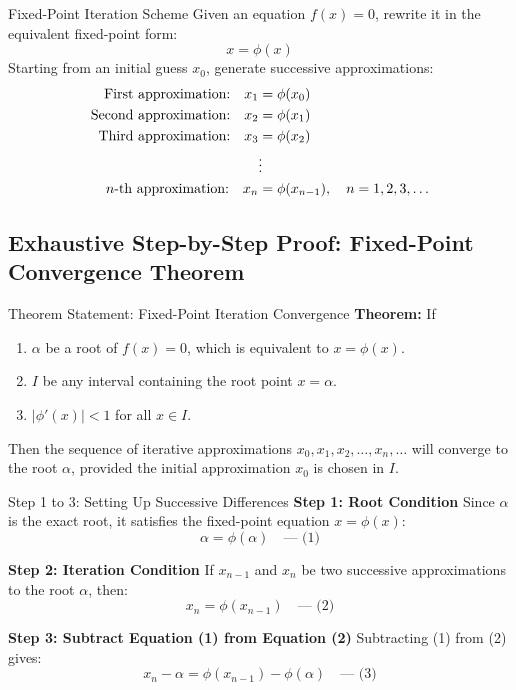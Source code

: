 \documentclass[11pt,a4paper]{article}
\begin{document}
\begin{defbox}{Fixed-Point Iteration Scheme}
Given an equation $f(x) = 0$, rewrite it in the equivalent fixed-point form:
\begin{equation}
    x = \phi(x)
\end{equation}
Starting from an initial guess $x_0$, generate successive approximations:
\begin{align}
    \text{First approximation:} \quad x_1 &= \phi(x_0) \notag \\
    \text{Second approximation:} \quad x_2 &= \phi(x_1) \notag \\
    \text{Third approximation:} \quad x_3 &= \phi(x_2) \notag \\
    &\vdots \notag \\
    \text{$n$-th approximation:} \quad x_n &= \phi(x_{n-1}), \quad n = 1, 2, 3, \dots
\end{align}
\end{defbox}

\subsection{Exhaustive Step-by-Step Proof: Fixed-Point Convergence Theorem}

\begin{defbox}{Theorem Statement: Fixed-Point Iteration Convergence}
\textbf{Theorem:} If
\begin{enumerate}
    \item[(i)] $\alpha$ be a root of $f(x) = 0$, which is equivalent to $x = \phi(x)$.
    \item[(ii)] $I$ be any interval containing the root point $x = \alpha$.
    \item[(iii)] $|\phi'(x)| < 1$ for all $x \in I$.
\end{enumerate}
Then the sequence of iterative approximations $x_0, x_1, x_2, \dots, x_n, \dots$ will converge to the root $\alpha$, provided the initial approximation $x_0$ is chosen in $I$.
\end{defbox}

\begin{exbox}{Step 1 to 3: Setting Up Successive Differences}
\textbf{Step 1: Root Condition}
Since $\alpha$ is the exact root, it satisfies the fixed-point equation $x = \phi(x)$:
\begin{equation}
    \alpha = \phi(\alpha) \quad \text{--- (1)}
\end{equation}

\textbf{Step 2: Iteration Condition}
If $x_{n-1}$ and $x_n$ be two successive approximations to the root $\alpha$, then:
\begin{equation}
    x_n = \phi(x_{n-1}) \quad \text{--- (2)}
\end{equation}

\textbf{Step 3: Subtract Equation (1) from Equation (2)}
Subtracting (1) from (2) gives:
\begin{equation}
    x_n - \alpha = \phi(x_{n-1}) - \phi(\alpha) \quad \text{--- (3)}
\end{equation}
\end{exbox}
\end{document}
